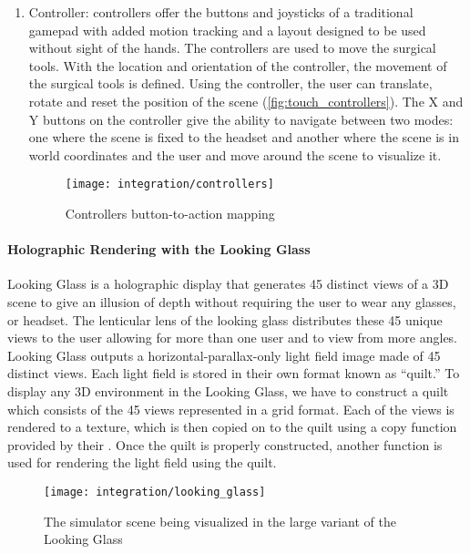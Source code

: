 \begin{enumerate}
  \item Controller:
   controllers offer the buttons and joysticks of a traditional gamepad with added motion tracking and a layout designed to be used without sight of the hands. The controllers are used to move the surgical tools. With the location and orientation of the controller, the movement of the surgical tools is defined. Using the controller, the user can translate, rotate and reset the position of the scene (\autoref{fig:touch_controllers}). The \textsf{X} and \textsf{Y} buttons on the controller give the ability to navigate between two modes: one where the scene is fixed to the headset and another where the scene is in world coordinates and the user and move around the scene to visualize it.

  \begin{figure}
    \centering
    \texttt{[image: integration/controllers]}
    \caption{Controllers button-to-action mapping}\label{fig:touch_controllers}
  \end{figure}
\end{enumerate}

\paragraph{Holographic Rendering with the Looking Glass}
Looking Glass is a holographic display that generates 45 distinct views of a 3D scene to give an illusion of depth without requiring the user to wear any glasses, or headset. The lenticular lens of the looking glass distributes these 45 unique views to the user allowing for more than one user and to view from more angles.
Looking Glass outputs a horizontal-parallax-only light field image made of 45 distinct views. Each light field is stored in their own format known as \enquote{quilt.} To display any 3D environment in the Looking Glass, we have to construct a quilt which consists of the 45 views represented in a grid format. Each of the views is rendered to a texture, which is then copied on to the quilt using a copy function provided by their . Once the quilt is properly constructed, another  function is used for rendering the light field using the quilt.

\begin{figure}
  \centering
  \texttt{[image: integration/looking\_glass]}
  \caption{The simulator scene being visualized in the large variant of the Looking Glass}\label{fig:looking_glass}
\end{figure}

